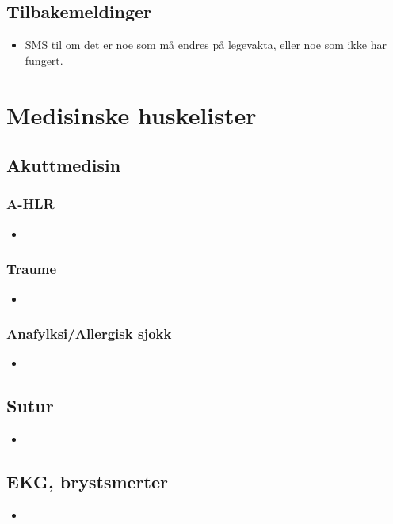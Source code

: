 	\section{Tilbakemeldinger}\label{sec:elv_feedbk}
		\begin{itemize}
			\item SMS til \pawmob{} om det er noe som må endres på legevakta, eller noe som ikke har fungert.
		\end{itemize}

\newpage
\chapter{Medisinske huskelister}
	\section{Akuttmedisin}
		\subsection{A-HLR}
			\begin{itemize}
				\item
			\end{itemize}
		\subsection{Traume}
			\begin{itemize}
				\item
			\end{itemize}
		\subsection{Anafylksi/Allergisk sjokk}
			\begin{itemize}
				\item
			\end{itemize}
	\section{Sutur}
		\begin{itemize}
			\item
		\end{itemize}
	\section{EKG, brystsmerter}
		\begin{itemize}
			\item
		\end{itemize}

